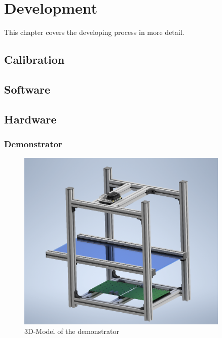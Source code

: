 \chapter{Development}
This chapter covers the developing process in more detail.

\section{Calibration}

\section{Software}

\section{Hardware}

\subsection{Demonstrator}

\begin{figure}[ht]
	\centering
	\includegraphics[width=0.9\textwidth]{3-development/images/Demonstrator.png}
	\caption{3D-Model of the demonstrator\label{development:demo}}
\end{figure} 
